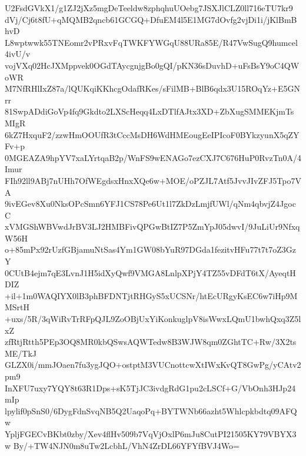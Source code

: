 U2FsdGVkX1/g1ZJ2jXz5mgDeTeeldw8zphqhuUOebg7JSXJlCLZ0ll716eTU7kr9
dVj/Cj6t8fU+qMQMB2qncb61GCGQ+DfuEM4l5E1MG7dOvfg2vjDi1i/jKlBmBhvD
L8wptwwk55TNEomr2vPRxvFqTWKFYWGqU88URa85E/R47VwSugQ9humcel4ivU/v
vojVXq02HcJXMppvek0OGdTAycgnjgBo0gQI/pKN36sDuvhD+uFsBsY9oC4QWoWR
M7NfRHlIxZ87a/lQUKqiKKhcgOdafRKes/sFilMB+BlB6qdx3U15ROqYz+E5GNrr
81SwpADdiGoVp4fq9Gkdto2LXScHeqq4LxDTlfAJtx3XD+ZbXugSMMEKjmTsMIgR
6kZ7HxquF2/zzwHmOOUfR3tCccMsDH6WdHMEougEeIPIcoF0BYkzyunX5qZYFv+p
0MGEAZA9hpYV7xaLYrtqaB2p/WnFS9wENAGo7ezCXJ7C676HuP0RvzTn0A/4Imur
FIh92ll9ABj7nUHh7OfWEgdsxHnxXQe6w+MOE/oPZJL7Atf5JvvJIvZFJ5Tpo7VA
9ivEGev8Xu0NksOPcSmn6YFJ1CS78Pe6Ut1l7ZkDzLmjfUWl/qNm4qbvjZ4JgocC
xVMGShWBVwdJrBV3LJ2HMBFivQPGwBtIZ7P5ZmYpJ05dwvI/9JuLiUr9NfxqW56H
o+85mPx92rUzfGBjamuNtSas4Ym1GW08bYuR97DGda1fezitvHFu77t7t7oZ3GzY
0CUtB4ejm7qE3LvnJ1H5idXyQwf9VMGA8LnlpXPjY4TZ55vDFdT6tX/AyeqtHDIZ
+il+1m0WAQIYX0lB3phBFDNTjtRHGyS5xUCSNr/htEcURgyKsEC6w7iHp9MMSrtH
+uxs/5R/3qWiRvTrRFpQJL9ZoOBjUxYiKonkuglpV8isWwxLQmU1bwhQxq3Z5lxZ
zfRtjRtth5PEp3OQ8MR0kbQSwsAQWTedw8B3WJW8qm0ZGhtTC+Rw/3X2tsME/TkJ
GLZX0i/mmJOaen7fu3ygJQO+ostptM3VUCnottcwXtIWxKvQT8GwPg/yCAtv2pm9
InXFU7uxy7YQY8t63R1Dps+sK5TjJC3ivdgRdG1pu2cLSCf+G/VbOnh3HJp24mIp
lpylif0pSnS0/6DygFdnSvqNB5Q2UaqoPq+BYTWNb66azht5Whlcpkbdtq09AFQw
YpljFGECvBKbt0zby/Xev4flHv509b7VqVjOxlP6mJu8CutPI21505KY79VBYX3w
By/+TW4NJN0m8uTw2LcbhL/VhN4ZrDL66YFYfBVJ4Wo=
